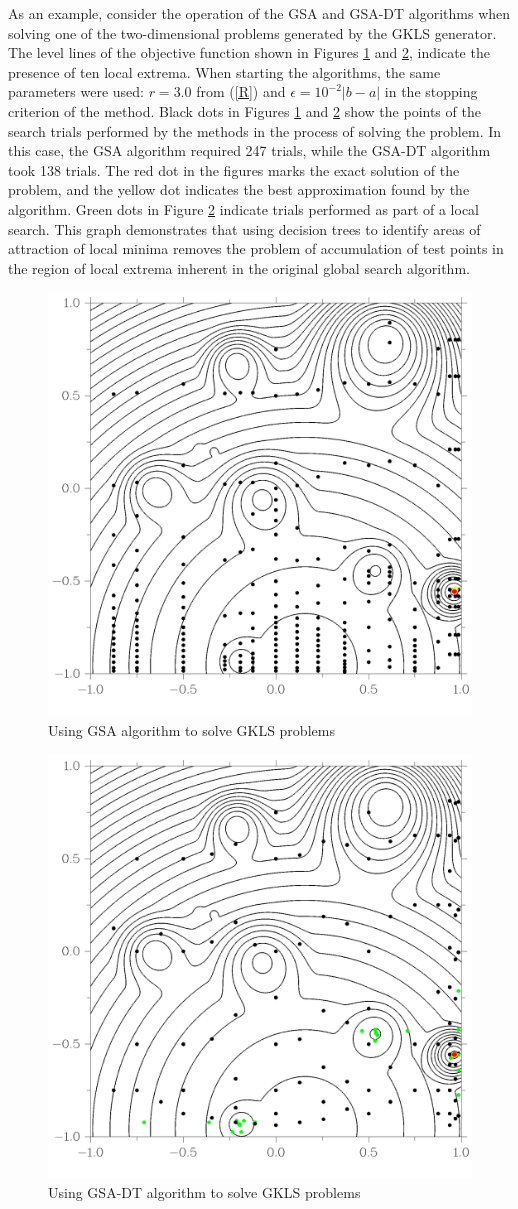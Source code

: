 \documentclass[entropy,article,submit,moreauthors,pdftex]{Definitions/mdpi}
\begin{document}
As an example, consider the operation of the GSA and GSA-DT algorithms when solving one of the two-dimensional problems generated by the GKLS generator. 
The level lines of the objective function shown in Figures \ref{fig3} and \ref{fig4}, indicate the presence of ten local extrema. 
When starting the algorithms, the same parameters were used:  $r=3.0$ from (\ref{R}) and $\epsilon = 10^{-2}\left|b-a\right|$ in the stopping criterion of the method. 
Black dots in Figures \ref{fig3} and \ref{fig4} show the points of the search trials performed by the methods in the process of solving the problem. In this case, the GSA algorithm required 247 trials, while the GSA-DT algorithm took 138 trials.
The red dot in the figures marks the exact solution of the problem, and the yellow dot indicates the best approximation found by the algorithm. 
Green dots in Figure \ref{fig4} indicate trials performed as part of a local search. 
This graph demonstrates that using decision trees to identify areas of attraction of local minima removes the problem of accumulation of test points in the region of local extrema inherent in the original global search algorithm.


\begin{figure}[H]
\includegraphics[width=0.6\linewidth]{GKLSAdaptiv6_30line.png}
\caption{Using GSA algorithm to solve GKLS problems}
\label{fig3}
\end{figure}   

\begin{figure}[H]
\includegraphics[width=0.6\linewidth]{GKLSTree6_30line.png}
\caption{Using GSA-DT algorithm to solve GKLS problems}
\label{fig4}
\end{figure}   
\end{document}
